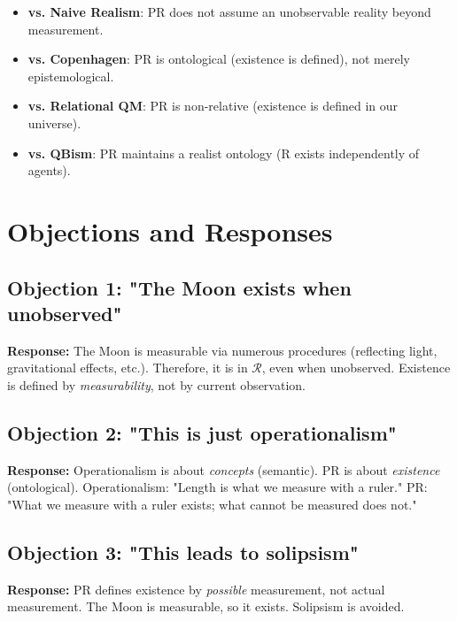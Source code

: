 \documentclass[aps,preprint,showpacs,showkeys]{revtex4}%
\begin{document}
\begin{itemize}
\item \textbf{vs. Naive Realism}: PR does not assume an unobservable reality
beyond measurement.

\item \textbf{vs. Copenhagen}: PR is ontological (existence is defined), not
merely epistemological.

\item \textbf{vs. Relational QM}: PR is non-relative (existence is defined
in our universe).

\item \textbf{vs. QBism}: PR maintains a realist ontology (R exists
independently of agents).
\end{itemize}

\section{Objections and Responses}

\subsection{Objection 1: "The Moon exists when unobserved"}

\textbf{Response:} The Moon is measurable via numerous procedures
(reflecting light, gravitational effects, etc.). Therefore, it is in $%
\mathcal{R}$, even when unobserved. Existence is defined by \emph{%
measurability}, not by current observation.

\subsection{Objection 2: "This is just operationalism"}

\textbf{Response:} Operationalism is about \emph{concepts} (semantic). PR is
about \emph{existence} (ontological). Operationalism: "Length is what we
measure with a ruler." PR: "What we measure with a ruler exists; what cannot
be measured does not."

\subsection{Objection 3: "This leads to solipsism"}

\textbf{Response:} PR defines existence by \emph{possible} measurement, not
actual measurement. The Moon is measurable, so it exists. Solipsism is
avoided.
\end{document}
